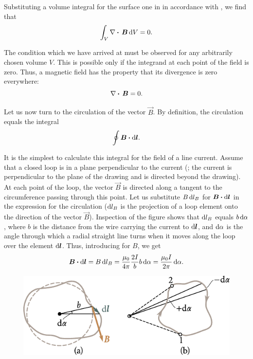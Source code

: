 Substituting a volume integral for the surface one in  in accordance with , we find that
\begin{equation*}
    \int_V \nabla\boldsymbol{\cdot}\,\boldsymbol{B}\, \mathrm{d} V = 0.
\end{equation*}

\noindent
The condition which we have arrived at must be observed for any arbitrarily chosen volume $V$. This is possible only if the integrand at each point of the field is zero. Thus, a magnetic field has the property that its divergence is zero everywhere:
\begin{equation}\label{eq:6_96}
    \nabla\boldsymbol{\cdot}\,\boldsymbol{B} = 0.
\end{equation}

Let us now turn to the circulation of the vector $\vec{B}$. By definition, the circulation equals the integral
\begin{equation}\label{eq:6_97}
    \oint \boldsymbol{B} \boldsymbol{\cdot} \mathrm{d}\boldsymbol{l}.
\end{equation}

\noindent
It is the simplest to calculate this integral for the field of a line current. Assume that a closed loop is in a plane perpendicular to the current (; the current is perpendicular to the plane of the drawing and is directed beyond the drawing). At each point of the loop, the vector $\vec{B}$ is directed along a tangent to the circumference passing through this point. Let us substitute $B\,\mathrm{d} l_B$ for $\boldsymbol{B}\boldsymbol{\cdot} \mathrm{d}\boldsymbol{l}$ in the expression for the circulation ($\mathrm{d} l_B$ is the projection of a loop element onto the direction of the vector $\vec{B}$). Inspection of the figure shows that $\mathrm{d} l_B$ equals $b\,\mathrm{d}\alpha$, where $b$ is the distance from the wire carrying the current to $\mathrm{d}\boldsymbol{l}$, and $\mathrm{d}\alpha$ is the angle through which a radial straight line turns when it moves along the loop over the element $\mathrm{d}\boldsymbol{l}$.
Thus, introducing  for $B$, we get
\begin{equation}\label{eq:6_98}
    \boldsymbol{B} \boldsymbol{\cdot} \mathrm{d}\boldsymbol{l} = B\,\mathrm{d} l_B = \frac{\mu_0}{4\pi} \frac{2I}{b} b\, \mathrm{d}\alpha = \frac{\mu_0 I}{2\pi}\, \mathrm{d}\alpha.
\end{equation}

\begin{figure}[t]
	\begin{center}
		\includegraphics[scale=1.0]{figures/ch_06/fig_6_24.pdf}
		\caption[]{}
		\label{fig:6_24}
	\end{center}
	\vspace{-0.8cm}
\end{figure}

